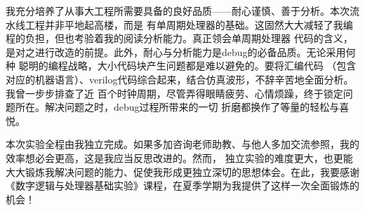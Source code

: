 \documentclass[10pt]{article}
\begin{document}
我充分培养了从事大工程所需要具备的良好品质——耐心谨慎、善于分析。本次流水线工程并非平地起高楼，而是
有单周期处理器的基础。这固然大大减轻了我编程的负担，但也考验着我的阅读分析能力。真正领会单周期处理器
代码的含义，是对之进行改造的前提。此外，耐心与分析能力是debug的必备品质。无论采用何种
聪明的编程战略，大小代码块产生问题都是难以避免的。要将汇编代码
（包含对应的机器语言）、verilog代码综合起来，结合仿真波形，不辞辛苦地全面分析。我曾一步步排查了近
百个时钟周期，尽管弄得眼睛疲劳、心情烦躁，终于锁定问题所在。解决问题之时，debug过程所带来的一切
折磨都换作了等量的轻松与喜悦。

本次实验全程由我独立完成。如果多加咨询老师助教、与他人多加交流参照，我的效率想必会更高，这是我应当反思改进的。然而，
独立实验的难度更大，也更能大大锻炼我解决问题的能力、促使我形成更独立深切的思想体会。在此，我要感谢
《数字逻辑与处理器基础实验》课程，在夏季学期为我提供了这样一次全面锻炼的机会！
\end{document}

